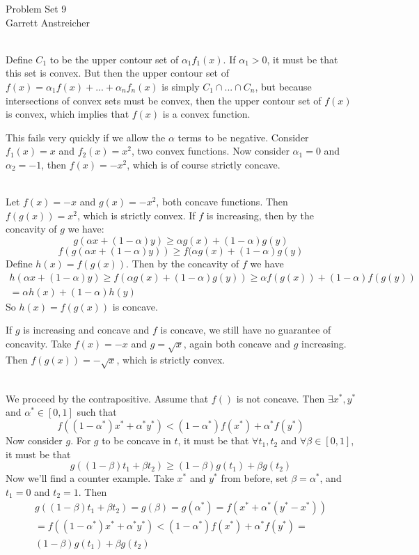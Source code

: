 \documentclass[12pt,leqno]{article}
\begin{document}
\begin{center}
\Large{Problem Set 9}\\
\large{Garrett Anstreicher}
\end{center}

\bigskip
{}\\
\indent Define $C_1$ to be the upper contour set of $\alpha_1 f_1(x)$. If $\alpha_1>0$, it must be that this set is convex. But then the upper contour set of $f(x) = \alpha_1 f(x) + . . . + \alpha_n f_n(x)$ is simply $C_1 \cap . . . \cap C_n$, but because intersections of convex sets must be convex, then the upper contour set of $f(x)$ is convex, which implies that $f(x)$ is a convex function.

This fails very quickly if we allow the $\alpha$ terms to be negative. Consider $f_1(x) = x$ and $f_2(x) = x^2$, two convex functions. Now consider $\alpha_1 = 0$ and $\alpha_2 = -1$, then $f(x) = -x^2$, which is of course strictly concave.

\bigskip
{}\\
\indent Let $f(x) = -x$ and $g(x) = -x^2$, both concave functions. Then $f(g(x)) = x^2$, which is strictly convex. If $f$ is increasing, then by the concavity of $g$ we have:
$$g(\alpha x + (1-\alpha)y)\geq \alpha g(x) + (1-\alpha)g(y)$$
$$f(g(\alpha x + (1-\alpha)y)) \geq f(\alpha g(x) + (1-\alpha)g(y)$$
Define $h(x) = f(g(x))$. Then by the concavity of $f$ we have
\begin{multline*}
h(\alpha x + (1-\alpha)y) \geq f(\alpha g(x) + (1-\alpha)g(y)) \geq \alpha f(g(x)) + (1-\alpha)f(g(y)) \\
= \alpha h(x) + (1-\alpha)h(y)
\end{multline*}
So $h(x) = f(g(x))$ is concave.

\indent If $g$ is increasing and concave and $f$ is concave, we still have no guarantee of concavity. Take $f(x) = -x$ and $g = \sqrt{x}$, again both concave and $g$ increasing. Then $f(g(x)) = -\sqrt{x}$, which is strictly convex.

\bigskip
{}\\
We proceed by the contrapositive. Assume that $f()$ is not concave. Then $\exists x^*, y^*$ and $\alpha^* \in [0, 1]$ such that 
$$f((1-\alpha^*)x^* + \alpha^* y^*)<(1-\alpha^*)f(x^*) + \alpha^* f(y^*)$$
Now consider $g$. For $g$ to be concave in $t$, it must be that $\forall t_1, t_2$ and $\forall \beta \in [0, 1]$, it must be that
$$g((1-\beta)t_1 + \beta t_2)\geq (1-\beta)g(t_1) + \beta g(t_2)$$
Now we'll find a counter example. Take $x^*$ and $y^*$ from before, set $\beta = \alpha^*$, and $t_1 = 0$ and $t_2 = 1$. Then
\begin{multline*}
g((1-\beta)t_1 + \beta t_2) = g(\beta) = g(\alpha^*) = f(x^* + \alpha^*(y^* - x^*)) \\
= f((1-\alpha^*)x^* + \alpha^* y^*)<(1-\alpha^*)f(x^*) + \alpha^*f(y^*) = \\
(1-\beta)g(t_1) + \beta g(t_2)
\end{multline*}
\end{document}

